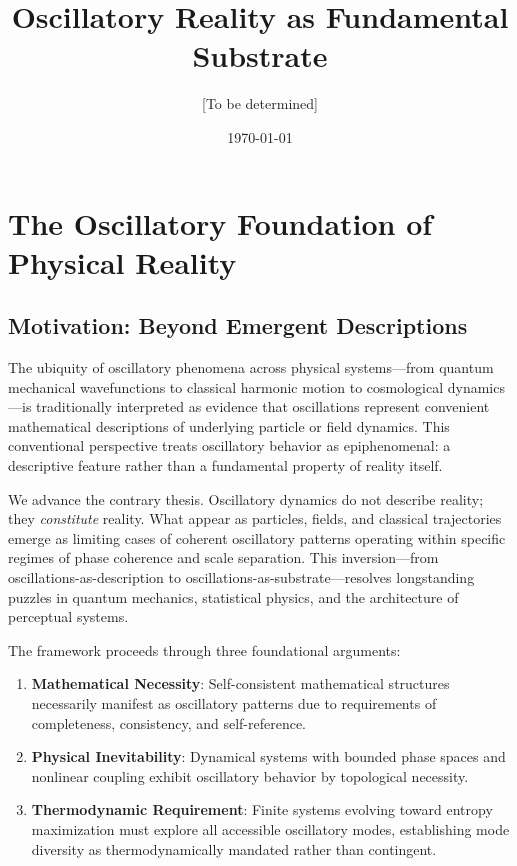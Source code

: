 \documentclass[11pt]{article}
\title{Oscillatory Reality as Fundamental Substrate}
\author{[To be determined]}
\date{\today}
\theoremstyle{remark}
\begin{document}
\maketitle

\section{The Oscillatory Foundation of Physical Reality}

\subsection{Motivation: Beyond Emergent Descriptions}

The ubiquity of oscillatory phenomena across physical systems—from quantum mechanical wavefunctions to classical harmonic motion to cosmological dynamics—is traditionally interpreted as evidence that oscillations represent convenient mathematical descriptions of underlying particle or field dynamics. This conventional perspective treats oscillatory behavior as epiphenomenal: a descriptive feature rather than a fundamental property of reality itself.

We advance the contrary thesis. Oscillatory dynamics do not describe reality; they \textit{constitute} reality. What appear as particles, fields, and classical trajectories emerge as limiting cases of coherent oscillatory patterns operating within specific regimes of phase coherence and scale separation. This inversion—from oscillations-as-description to oscillations-as-substrate—resolves longstanding puzzles in quantum mechanics, statistical physics, and the architecture of perceptual systems.

The framework proceeds through three foundational arguments:

\begin{enumerate}
\item \textbf{Mathematical Necessity}: Self-consistent mathematical structures necessarily manifest as oscillatory patterns due to requirements of completeness, consistency, and self-reference.

\item \textbf{Physical Inevitability}: Dynamical systems with bounded phase spaces and nonlinear coupling exhibit oscillatory behavior by topological necessity.

\item \textbf{Thermodynamic Requirement}: Finite systems evolving toward entropy maximization must explore all accessible oscillatory modes, establishing mode diversity as thermodynamically mandated rather than contingent.
\end{enumerate}
\end{document}
